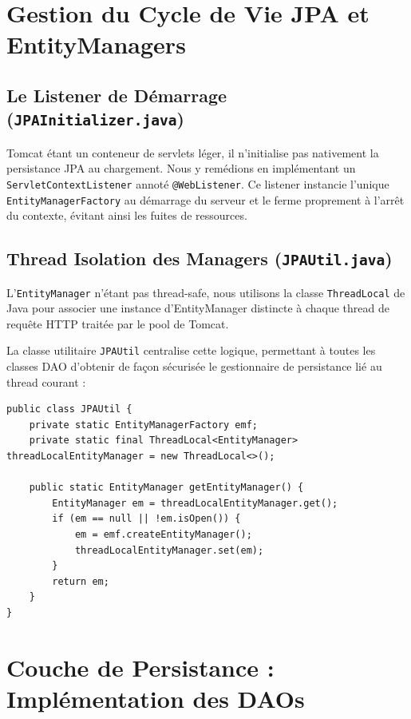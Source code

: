 \documentclass[12pt,a4paper]{article}
\begin{document}
\section{Gestion du Cycle de Vie JPA et EntityManagers}

\subsection{Le Listener de Démarrage (\texttt{JPAInitializer.java})}
Tomcat étant un conteneur de servlets léger, il n'initialise pas nativement la persistance JPA au chargement. Nous y remédions en implémentant un \texttt{ServletContextListener} annoté \texttt{@WebListener}. Ce listener instancie l'unique \texttt{EntityManagerFactory} au démarrage du serveur et le ferme proprement à l'arrêt du contexte, évitant ainsi les fuites de ressources.

\subsection{Thread Isolation des Managers (\texttt{JPAUtil.java})}
L'\texttt{EntityManager} n'étant pas thread-safe, nous utilisons la classe \texttt{ThreadLocal} de Java pour associer une instance d'EntityManager distincte à chaque thread de requête HTTP traitée par le pool de Tomcat. 

La classe utilitaire \texttt{JPAUtil} centralise cette logique, permettant à toutes les classes DAO d'obtenir de façon sécurisée le gestionnaire de persistance lié au thread courant :

\begin{lstlisting}[caption={Gestion du ThreadLocal pour l'EntityManager dans JPAUtil.java}]
public class JPAUtil {
    private static EntityManagerFactory emf;
    private static final ThreadLocal<EntityManager> threadLocalEntityManager = new ThreadLocal<>();

    public static EntityManager getEntityManager() {
        EntityManager em = threadLocalEntityManager.get();
        if (em == null || !em.isOpen()) {
            em = emf.createEntityManager();
            threadLocalEntityManager.set(em);
        }
        return em;
    }
}
\end{lstlisting}

\section{Couche de Persistance : Implémentation des DAOs}
\end{document}
